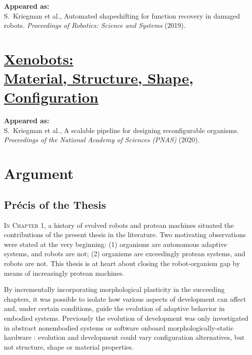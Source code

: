 \textbf{Appeared as:}\\
S.~Kriegman et al., Automated shapeshifting for function recovery in damaged robots. \textit{Proceedings of Robotics: Science and Systems} (2019).


\chapter[Xenobots: Material, Structure, Shape, Configuration]{\href{https://www.pnas.org/content/117/4/1853}{\color{blue}Xenobots: \\ {\LARGE Material, Structure, Shape, Configuration}}}

\textbf{Appeared as:}\\
S.~Kriegman et al., A scalable pipeline for designing reconfigurable organisms. 
\textit{Proceedings of the National Academy of Sciences (PNAS)} (2020).





\chapter{Argument}


\section{Pr\'{e}cis of the Thesis}

\textsc{In Chapter 1,}
a history of 
evolved robots 
and protean machines 
situated the contributions of the present thesis in the literature.
Two motivating observations were stated at the very beginning:
(1) organisms are autonomous adaptive systems, and robots are not;
(2) organisms are exceedingly protean systems, and robots are not.
This thesis is at heart about closing the robot-organism gap by means of increasingly protean machines.


By incrementally incorporating morphological plasticity in the succeeding chapters, it was possible to isolate how various aspects of development can affect and, under certain conditions, guide the evolution of adaptive behavior in embodied systems.
Previously the evolution of development was only investigated in abstract nonembodied systems \cite{hinton1987learning} 
or software onboard morphologically-static hardware
\cite{husbands1998better,floreano1996plastic}:
evolution and development could 
vary configuration alternatives, but
not structure, shape or material properties.

